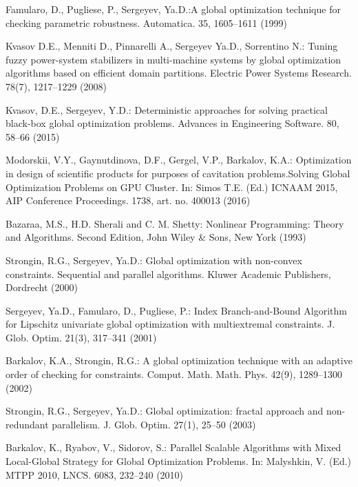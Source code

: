 \documentclass{llncs}
\begin{document}
\begin{thebibliography}{99}

Famularo, D., Pugliese, P., Sergeyev, Ya.D.:A global optimization technique for checking parametric robustness. Automatica. 35, 1605--1611 (1999)

Kvasov D.E., Menniti D., Pinnarelli A., Sergeyev Ya.D., Sorrentino N.: Tuning fuzzy power-system stabilizers in multi-machine systems by global optimization algorithms based on efficient domain partitions. Electric Power Systems Research. 78(7), 1217--1229 (2008)

Kvasov, D.E., Sergeyev, Y.D.: Deterministic approaches for solving practical black-box global optimization problems. Advances in Engineering Software. 80, 58--66 (2015)

Modorskii, V.Y., Gaynutdinova, D.F., Gergel, V.P., Barkalov, K.A.: Optimization in design of scientific products for purposes of cavitation problems.Solving Global Optimization Problems on GPU Cluster. In: Simos T.E. (Ed.) ICNAAM 2015, AIP Conference Proceedings. 1738, art. no. 400013 (2016)

Bazaraa, M.S., H.D. Sherali and C. M. Shetty: Nonlinear Programming: Theory and Algorithms. Second Edition, John Wiley \& Sons, New York (1993)

Strongin, R.G., Sergeyev, Ya.D.: Global optimization with non-convex constraints. Sequential and parallel algorithms. Kluwer Academic Publishers, Dordrecht (2000)

Sergeyev, Ya.D., Famularo, D., Pugliese, P.: Index Branch-and-Bound Algorithm for Lipschitz univariate global optimization with multiextremal constraints. J. Glob. Optim. 21(3), 317--341 (2001)

Barkalov, K.A., Strongin, R.G.: A global optimization technique with an adaptive order of checking for constraints. Comput. Math. Math. Phys. 42(9), 1289--1300 (2002)

Strongin, R.G., Sergeyev, Ya.D.: Global optimization: fractal approach and non-redundant parallelism. J. Glob. Optim. 27(1), 25--50 (2003)

Barkalov, K., Ryabov, V., Sidorov, S.: Parallel Scalable Algorithms with Mixed Local-Global Strategy for Global Optimization Problems. In: Malyshkin, V. (Ed.) MTPP 2010, LNCS. 6083, 232--240 (2010)


\end{thebibliography}
\end{document}
